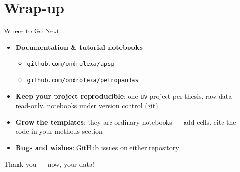 \documentclass[aspectratio=169,11pt]{beamer}
\begin{document}
\section{Wrap-up}

\begin{frame}{Where to Go Next}
  \begin{itemize}
    \item \textbf{Documentation \& tutorial notebooks}
          \begin{itemize}
            \item \texttt{github.com/ondrolexa/apsg}
            \item \texttt{github.com/ondrolexa/petropandas}
          \end{itemize}
    \item \textbf{Keep your project reproducible}: one \texttt{uv} project per thesis,
          raw data read-only, notebooks under version control (git)
    \item \textbf{Grow the templates}: they are ordinary notebooks --- add cells, cite
          the code in your methods section
    \item \textbf{Bugs and wishes}: GitHub issues on either repository
  \end{itemize}
  \vspace{0.5cm}
  \centering \Large Thank you --- now, your data!
\end{frame}
\end{document}
